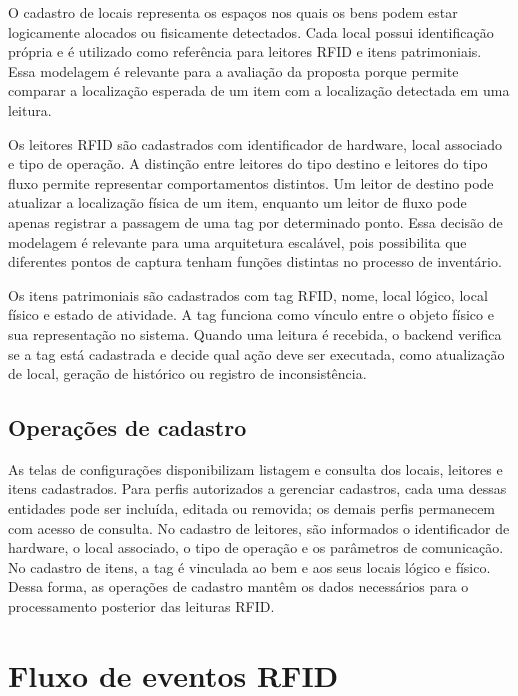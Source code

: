 O cadastro de locais representa os espaços nos quais os bens podem estar logicamente alocados ou fisicamente detectados. Cada local possui identificação própria e é utilizado como referência para leitores RFID e itens patrimoniais. Essa modelagem é relevante para a avaliação da proposta porque permite comparar a localização esperada de um item com a localização detectada em uma leitura.

Os leitores RFID são cadastrados com identificador de hardware, local associado e tipo de operação. A distinção entre leitores do tipo destino e leitores do tipo fluxo permite representar comportamentos distintos. Um leitor de destino pode atualizar a localização física de um item, enquanto um leitor de fluxo pode apenas registrar a passagem de uma tag por determinado ponto. Essa decisão de modelagem é relevante para uma arquitetura escalável, pois possibilita que diferentes pontos de captura tenham funções distintas no processo de inventário.

Os itens patrimoniais são cadastrados com tag RFID, nome, local lógico, local físico e estado de atividade. A tag funciona como vínculo entre o objeto físico e sua representação no sistema. Quando uma leitura é recebida, o backend verifica se a tag está cadastrada e decide qual ação deve ser executada, como atualização de local, geração de histórico ou registro de inconsistência.

\subsection{Operações de cadastro}
\label{sec:operacoes-cadastro}

As telas de configurações disponibilizam listagem e consulta dos locais, leitores e itens cadastrados. Para perfis autorizados a gerenciar cadastros, cada uma dessas entidades pode ser incluída, editada ou removida; os demais perfis permanecem com acesso de consulta. No cadastro de leitores, são informados o identificador de hardware, o local associado, o tipo de operação e os parâmetros de comunicação. No cadastro de itens, a tag é vinculada ao bem e aos seus locais lógico e físico. Dessa forma, as operações de cadastro mantêm os dados necessários para o processamento posterior das leituras RFID.

\section{Fluxo de eventos RFID}
\label{sec:fluxo-eventos-rfid}

